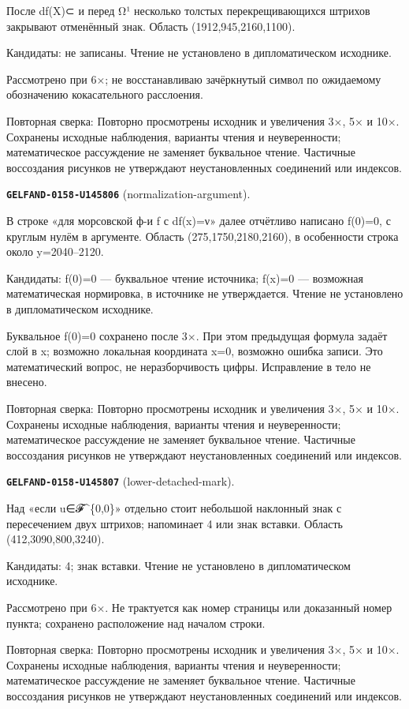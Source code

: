 После df(X)⊂ и перед Ω¹ несколько толстых перекрещивающихся штрихов закрывают отменённый знак. Область (1912,945,2160,1100).\par
Кандидаты: не записаны. Чтение не установлено в дипломатическом исходнике.\par
Рассмотрено при 6×; не восстанавливаю зачёркнутый символ по ожидаемому обозначению кокасательного расслоения.\par
Повторная сверка: Повторно просмотрены исходник и увеличения 3×, 5× и 10×. Сохранены исходные наблюдения, варианты чтения и неуверенности; математическое рассуждение не заменяет буквальное чтение. Частичные воссоздания рисунков не утверждают неустановленных соединений или индексов.\par\medskip
\par\noindent\leavevmode{}\label{GELFAND-0158-U145806}\label{GELFAND-P001458:normalization-argument}\textbf{\texttt{GELFAND-0158-U145806}} (normalization-argument).\nopagebreak[4]\par
В строке «для морсовской ф-и f с df(x)=ν» далее отчётливо написано f(0)=0, с круглым нулём в аргументе. Область (275,1750,2180,2160), в особенности строка около y=2040–2120.\par
Кандидаты: f(0)=0 — буквальное чтение источника; f(x)=0 — возможная математическая нормировка, в источнике не утверждается. Чтение не установлено в дипломатическом исходнике.\par
Буквальное f(0)=0 сохранено после 3×. При этом предыдущая формула задаёт слой в x; возможно локальная координата x=0, возможно ошибка записи. Это математический вопрос, не неразборчивость цифры. Исправление в тело не внесено.\par
Повторная сверка: Повторно просмотрены исходник и увеличения 3×, 5× и 10×. Сохранены исходные наблюдения, варианты чтения и неуверенности; математическое рассуждение не заменяет буквальное чтение. Частичные воссоздания рисунков не утверждают неустановленных соединений или индексов.\par\medskip
\par\noindent\leavevmode{}\label{GELFAND-0158-U145807}\label{GELFAND-P001458:lower-detached-mark}\textbf{\texttt{GELFAND-0158-U145807}} (lower-detached-mark).\nopagebreak[4]\par
Над «если u∈𝓕\textasciicircum{}\{0,0\}» отдельно стоит небольшой наклонный знак с пересечением двух штрихов; напоминает 4 или знак вставки. Область (412,3090,800,3240).\par
Кандидаты: 4; знак вставки. Чтение не установлено в дипломатическом исходнике.\par
Рассмотрено при 6×. Не трактуется как номер страницы или доказанный номер пункта; сохранено расположение над началом строки.\par
Повторная сверка: Повторно просмотрены исходник и увеличения 3×, 5× и 10×. Сохранены исходные наблюдения, варианты чтения и неуверенности; математическое рассуждение не заменяет буквальное чтение. Частичные воссоздания рисунков не утверждают неустановленных соединений или индексов.\par\medskip
